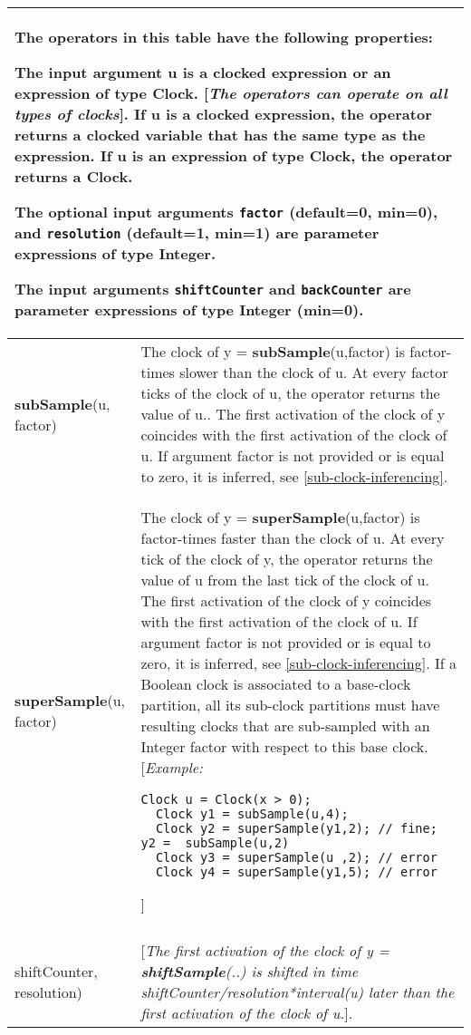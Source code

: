 \begin{longtable}[]{|p{4cm}|p{11cm}|}
\hline \endhead
\multicolumn{2}{|p{15cm}|}{
The operators in this table have the following properties:

The input argument u is a clocked expression or an expression of type
Clock. {[}\emph{The operators can operate on all types of clocks}{]}. If
u is a clocked expression, the operator returns a clocked variable that
has the same type as the expression. If u is an expression of type
Clock, the operator returns a Clock.

The optional input arguments \lstinline!factor! (default=0, min=0), and \lstinline!resolution!
(default=1, min=1) are parameter expressions of type Integer.

The input arguments \lstinline!shiftCounter! and \lstinline!backCounter! are parameter
expressions of type Integer (min=0).}
\\ \hline
\textbf{subSample}(u, factor)
&
The clock of y = \textbf{subSample}(u,factor) is factor-times slower
than the clock of u. At every factor ticks of the clock of u, the
operator returns the value of u.. The first activation of the clock of y
coincides with the first activation of the clock of u. If argument
factor is not provided or is equal to zero, it is inferred, see 
\autoref{sub-clock-inferencing}.
\\ \hline
\textbf{superSample}(u, factor)
&
The clock of y = \textbf{superSample}(u,factor) is factor-times faster
than the clock of u. At every tick of the clock of y, the operator
returns the value of u from the last tick of the clock of u. The first
activation of the clock of y coincides with the first activation of the
clock of u. If argument factor is not provided or is equal to zero, it
is inferred, see \autoref{sub-clock-inferencing}. If a Boolean clock is associated to a
base-clock partition, all its sub-clock partitions must have resulting
clocks that are sub-sampled with an Integer factor with respect to this
base clock.
{[}\emph{Example:}
\begin{lstlisting}[language=modelica]
  Clock u = Clock(x > 0);
  Clock y1 = subSample(u,4);
  Clock y2 = superSample(y1,2); // fine; y2 =  subSample(u,2)
  Clock y3 = superSample(u ,2); // error
  Clock y4 = superSample(y1,5); // error
\end{lstlisting}
  {]}\\ \hline
\begin{tabular}{@{}p{4cm}@{}}
\textbf{shiftSample}(u,\\
shiftCounter, resolution)
\end{tabular}
& {[}\emph{The first activation of the clock of y =
\textbf{shiftSample}(..) is shifted in time
shiftCounter/resolution*interval(u) later than the first activation of
the clock of u.}{]}.


\end{longtable}
